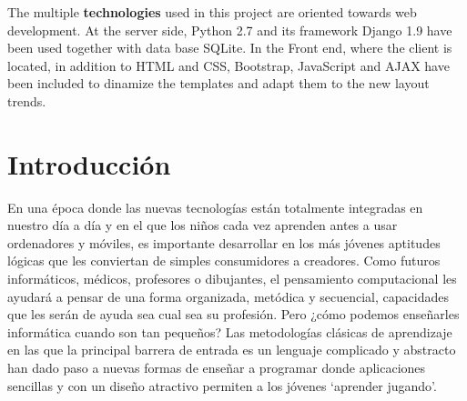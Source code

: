 \documentclass[a4paper, 12pt]{book}
\begin{document}
The multiple \textbf{technologies} used in this project are oriented towards web development. At the server side, Python 2.7 and its framework Django 1.9 have been used together with data base SQLite. In the Front end, where the client is located, in addition to HTML and CSS, Bootstrap, JavaScript and AJAX have been included to dinamize the templates and adapt them to the new layout trends.



\tableofcontents 
\cleardoublepage
\listoffigures %



\cleardoublepage
\chapter{Introducción}
\label{sec:intro} %

En una época donde las nuevas tecnologías están totalmente integradas en nuestro día a día y en el que los niños cada vez aprenden antes a usar ordenadores y móviles, es importante desarrollar en los más jóvenes aptitudes lógicas que les conviertan de simples consumidores a creadores. 
Como futuros informáticos, médicos, profesores o dibujantes, el pensamiento computacional les ayudará a pensar de una forma organizada, metódica y secuencial, capacidades que les serán de ayuda sea cual sea su profesión. Pero ¿cómo podemos enseñarles informática cuando son tan pequeños? Las metodologías clásicas de aprendizaje en las que la principal barrera de entrada es un lenguaje complicado y abstracto han dado paso a nuevas formas de enseñar a programar donde aplicaciones sencillas y con un diseño atractivo permiten a los jóvenes `aprender jugando'.
\end{document}
